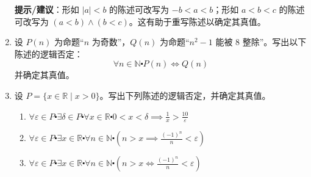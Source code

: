 \begin{enumerate}[label=(\arabic*)]
\begin{enumerate}[label=(\alph*)]
        \end{enumerate}
        \textbf{提示/建议}：形如 $|a| < b$ 的陈述可改写为 $-b < a < b$；形如 $a < b < c$ 的陈述可改写为 $(a < b) \land (b < c)$。这有助于重写陈述以确定其真值。
    \item 设 $P(n)$ 为命题``$n$ 为奇数''，$Q(n)$ 为命题``$n^2 - 1$ 能被 $8$ 整除''。写出以下陈述的逻辑否定：
        \[\forall n \in \mathbb{N} \centerdot P(n) \iff Q(n)\]
        并确定其真值。
    \item 设 $P = \{x \in \mathbb{R} \mid x > 0\}$。写出下列陈述的逻辑否定，并确定其真值。
        \begin{enumerate}[label=(\alph*)]
            \item $\forall \varepsilon \in P \centerdot \exists \delta \in P \centerdot \forall x \in \mathbb{R} \centerdot 0 < x < \delta \implies \frac{1}{x} > \frac{10}{\varepsilon}$
            \item $\forall \varepsilon \in P \centerdot \exists x \in \mathbb{R} \centerdot \forall n \in \mathbb{N} \centerdot (n > x \implies \frac{(-1)^n}{n} < \varepsilon)$
            \item $\forall \varepsilon \in P \centerdot \exists x \in \mathbb{R} \centerdot \forall n \in \mathbb{N} \centerdot (n > x \iff\frac{(-1)^n}{n} < \varepsilon)$
        \end{enumerate}
\end{enumerate}